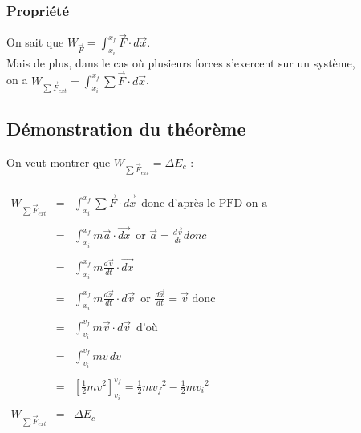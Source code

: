 \documentclass[a4paper,10pt]{book}
\begin{document}
\subsubsection{Propriété}
On sait que $W_{\vec{F}}=\displaystyle \int_{x_{i}}^{x_{f}} \vec{F}\cdot d\vec{x}$.\\

Mais de plus, dans le cas où plusieurs forces s'exercent sur un système,\\
on a $W_{\sum\vec{F}_{ext}}=\displaystyle \int_{x_{i}}^{x_{f}} \sum \vec{F}\cdot d\vec{x}$.\\

\subsection{Démonstration du théorème}
On veut montrer que $W_{\sum\vec{F}_{ext}}=\Delta E_{c}$ :\\\\

$\begin{array}{rcl} W_{\sum\vec{F}_{ext}}&=&\displaystyle \int_{x_{i}}^{x_{f}} \sum \vec{F}\cdot\vec{dx}\, \text{ donc d'après le PFD on a}\\\\
&=&\displaystyle \int_{x_{i}}^{x_{f}} m\vec{a}\cdot\vec{dx}\, \text{ or }\vec{a}=\frac{d\vec{v}}{dt} donc\\\\
&=&\displaystyle \int_{x_{i}}^{x_{f}} m\frac{d\vec{v}}{dt}\cdot\vec{dx}\\\\
&=&\displaystyle \int_{x_{i}}^{x_{f}} m\frac{d\vec{x}}{dt}\cdot d\vec{v}\, \text{ or }\frac{d\vec{x}}{dt}=\vec{v} \text{ donc}\\\\
&=&\displaystyle \int_{v_{i}}^{v_{f}} m\vec{v}\cdot d\vec{v}\, \text{ d'où}\\\\
&=&\displaystyle \int_{v_{i}}^{v_{f}} mv \, dv\\\\
&=&\left[ \frac{1}{2}mv^{2} \right]_{v_{i}}^{v_{f}}=\frac{1}{2}mv_{f}{}^{2}-\frac{1}{2}mv_{i}{}^{2}\\\\
W_{\sum\vec{F}_{ext}}&=&\Delta E_{c}\\\\\\\\\\\\ \end{array}$
\end{document}
